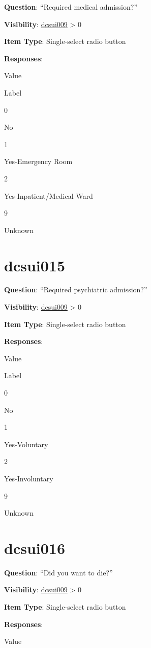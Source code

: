 \documentclass[]{book}
\begin{document}
\textbf{Question}: ``Required medical admission?''

\textbf{Visibility}: \protect\hyperlink{dcsui009}{dcsui009} \textgreater{} 0

\textbf{Item Type}: Single-select radio button

\textbf{Responses}:

Value

Label

0

No

1

Yes-Emergency Room

2

Yes-Inpatient/Medical Ward

9

Unknown

\hypertarget{dcsui015}{%
\section{dcsui015}\label{dcsui015}}

\textbf{Question}: ``Required psychiatric admission?''

\textbf{Visibility}: \protect\hyperlink{dcsui009}{dcsui009} \textgreater{} 0

\textbf{Item Type}: Single-select radio button

\textbf{Responses}:

Value

Label

0

No

1

Yes-Voluntary

2

Yes-Involuntary

9

Unknown

\hypertarget{dcsui016}{%
\section{dcsui016}\label{dcsui016}}

\textbf{Question}: ``Did you want to die?''

\textbf{Visibility}: \protect\hyperlink{dcsui009}{dcsui009} \textgreater{} 0

\textbf{Item Type}: Single-select radio button

\textbf{Responses}:

Value
\end{document}
